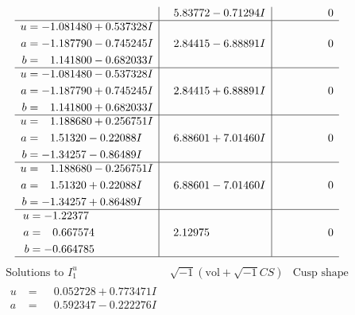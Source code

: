 \documentclass[1p]{elsarticle_modified}
\theoremstyle{definition}
\newcommand{\I}{\sqrt{-1}}
\begin{document}
$$\begin{array}{c|c|c}
 & \phantom{-}5.83772 - 0.71294 I & \phantom{-0.000000 } 0 \\ \hline\begin{aligned}
u &= -1.081480 + 0.537328 I \\
a &= -1.187790 - 0.745245 I \\
b &= \phantom{-}1.141800 - 0.682033 I\end{aligned}
 & \phantom{-}2.84415 - 6.88891 I & \phantom{-0.000000 } 0 \\ \hline\begin{aligned}
u &= -1.081480 - 0.537328 I \\
a &= -1.187790 + 0.745245 I \\
b &= \phantom{-}1.141800 + 0.682033 I\end{aligned}
 & \phantom{-}2.84415 + 6.88891 I & \phantom{-0.000000 } 0 \\ \hline\begin{aligned}
u &= \phantom{-}1.188680 + 0.256751 I \\
a &= \phantom{-}1.51320 - 0.22088 I \\
b &= -1.34257 - 0.86489 I\end{aligned}
 & \phantom{-}6.88601 + 7.01460 I & \phantom{-0.000000 } 0 \\ \hline\begin{aligned}
u &= \phantom{-}1.188680 - 0.256751 I \\
a &= \phantom{-}1.51320 + 0.22088 I \\
b &= -1.34257 + 0.86489 I\end{aligned}
 & \phantom{-}6.88601 - 7.01460 I & \phantom{-0.000000 } 0 \\ \hline\begin{aligned}
u &= -1.22377\phantom{ +0.000000I} \\
a &= \phantom{-}0.667574\phantom{ +0.000000I} \\
b &= -0.664785\phantom{ +0.000000I}\end{aligned}
 & \phantom{-}2.12975\phantom{ +0.000000I} & \phantom{-0.000000 } 0\\
 \hline 
 \end{array}$$\newpage$$\begin{array}{c|c|c}  
\text{Solutions to }I^u_{1}& \I (\text{vol} + \sqrt{-1}CS) & \text{Cusp shape}\\
 \hline 
\begin{aligned}
u &= \phantom{-}0.052728 + 0.773471 I \\
a &= \phantom{-}0.592347 - 0.222276 I \\

\end{aligned}
\end{array}$$
\end{document}
